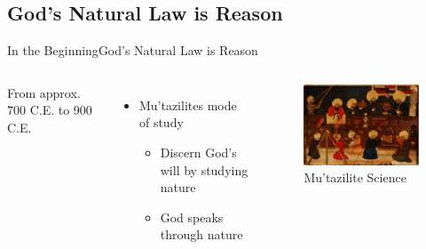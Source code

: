 \subsection{God's Natural Law is Reason}
\begin{frame}{In the Beginning}{God's Natural Law is Reason}
	\begin{columns}[c]
			From approx. 700 C.E. to 900 C.E.\\
			\begin{itemize}
				\item Mu'tazilites mode of study
					\begin{itemize}
						\item Discern God's will by studying nature
						\item God speaks through nature
					\end{itemize}
			\end{itemize}
			\begin{figure}
				\centering
				\includegraphics[width=\textwidth]{images/mutazilite_science}
				\caption{Mu'tazilite Science}
			\end{figure}
	\end{columns}
\end{frame}

